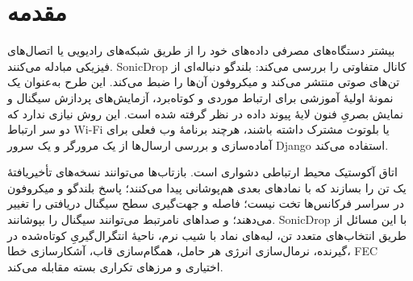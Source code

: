 \documentclass[12pt,a4paper]{article}
\providecommand{\lr}[1]{\foreignlanguage{english}{\begingroup\hyphenchar\font=-1 #1\endgroup}}
\begin{document}
\begin{abstract}
\lr{SonicDrop} یک مودم نرم‌افزارمحور و برنامۀ وب برای ارسال پیام‌های متنی کوتاه و تصاویر دودویی کوچک از طریق صوت است. فرستنده داده‌های برنامه را به بسته‌ها تبدیل می‌کند، یک سرآیند فشرده و \lr{CRC-8} به آن‌ها می‌افزاید، به‌صورت اختیاری کدگذاری طول‌دنباله (\lr{RLE}) و تصحیح خطای پیشرو (\lr{FEC}) همینگ \lr{(7,4)} را اعمال می‌کند، رشتۀ بیت‌ها را با پرچم‌ها و درج بیت به سبک \lr{HDLC} قاب‌بندی می‌کند و یک شکل‌موج تک‌کانالۀ \lr{M-FSK} تولید می‌کند. گیرنده یک فایل \lr{WAV} یا صدای میکروفون را می‌پذیرد، تن‌های کاندیدا را آشکار می‌کند، چند انحراف زمانیِ نماد را جست‌وجو می‌کند، قاب‌ها را بررسی می‌کند، خطاهای بیتیِ قابل‌تصحیح را اصلاح می‌کند و محتوای بسته‌ها را بازسازی می‌کند. رابط کاربری همچنین نویز شبیه‌سازی‌شدۀ کانال، معیارهای سیگنال، بازرسی قاب و یک نمایش \lr{ACK/NACK} صوتی هماهنگ‌شده در مرورگر را ارائه می‌دهد. این گزارش خط‌لولۀ پیاده‌سازی‌شده و مفروضات آن را شرح می‌دهد، محاسبات اسمی را از نتایج اندازه‌گیری‌شده جدا می‌کند و محدودیت‌های مهم نمونۀ اولیه را مشخص می‌کند. تبدیل سفارشی گذرکلید، رمزنگاریِ مناسب برای استفاده در محیط تولید نیست. همچنین، نمایش \lr{ARQ} در مرورگر یک پروتکل انتقال کامل به‌شمار نمی‌آید.
\end{abstract}

\tableofcontents
\clearpage

\section{مقدمه}
\label{sec:introduction}

بیشتر دستگاه‌های مصرفی داده‌های خود را از طریق شبکه‌های رادیویی یا اتصال‌های فیزیکی مبادله می‌کنند. \lr{SonicDrop} کانال متفاوتی را بررسی می‌کند: بلندگو دنباله‌ای از تن‌های صوتی منتشر می‌کند و میکروفون آن‌ها را ضبط می‌کند. این طرح به‌عنوان یک نمونۀ اولیۀ آموزشی برای ارتباط موردی و کوتاه‌برد، آزمایش‌های پردازش سیگنال و نمایش بصریِ فنون لایۀ پیوند داده در نظر گرفته شده است. این روش نیازی ندارد که دو سر ارتباط \lr{Wi-Fi} یا بلوتوث مشترک داشته باشند، هرچند برنامۀ وب فعلی برای آماده‌سازی و بررسی ارسال‌ها از یک مرورگر و یک سرور \lr{Django} استفاده می‌کند.

اتاق آکوستیک محیط ارتباطی دشواری است. بازتاب‌ها می‌توانند نسخه‌های تأخیریافتۀ یک تن را بسازند که با نمادهای بعدی هم‌پوشانی پیدا می‌کنند؛ پاسخ بلندگو و میکروفون در سراسر فرکانس‌ها تخت نیست؛ فاصله و جهت‌گیری سطح سیگنال دریافتی را تغییر می‌دهند؛ و صداهای نامرتبط می‌توانند سیگنال را بپوشانند. \lr{SonicDrop} با این مسائل از طریق انتخاب‌های متعدد تن، لبه‌های نماد با شیب نرم، ناحیۀ انتگرال‌گیریِ کوتاه‌شده در گیرنده، نرمال‌سازی انرژی هر حامل، همگام‌سازی قاب، آشکارسازی خطا، \lr{FEC} اختیاری و مرزهای تکراری بسته مقابله می‌کند.
\end{document}
